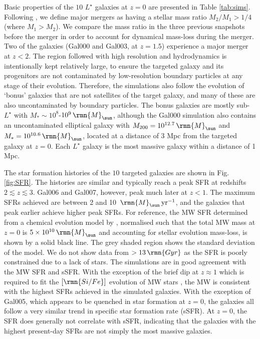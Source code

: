 \documentclass[fleqn,usenatbib]{mnras}
\newcommand\Msun{\,\rmn{M}_{\sun}}
\newcommand\Gyr{\,\rmn{Gyr}}
\newcommand{\pyr}{\,{\rm yr}^{-1}}
\newcommand{\numgal}{10}
\begin{document}
Basic properties of the $\numgal$ $L^\star$ galaxies at $z=0$ are presented in Table \ref{tab:sims}. Following \citet{Qu_et_al_17}, we define major mergers as having a stellar mass ratio $M_2/M_1 > 1/4$ (where $M_1>M_2$). We compare the mass ratio in the three previous snapshots before the merger in order to account for dynamical mass-loss during the merger. 
Two of the galaxies (Gal000 and Gal003, at $z=1.5$) experience a major merger at $z<2$. The region followed with high resolution and hydrodynamics is intentionally kept relatively large, to ensure the targeted galaxy and its progenitors are not contaminated by low-resolution boundary particles at any stage of their evolution. Therefore, the simulations also follow the evolution of `bonus' galaxies that are not satellites of the target galaxy, and many of these are also uncontaminated by boundary particles. The bonus galaxies are mostly sub-$L^\star$ with $M_\ast \sim 10^8$-$10^9 \Msun$, although the Gal000 simulation also contains an uncontaminated elliptical galaxy with $M_{200} = 10^{12.7} \Msun$ and $M_\ast = 10^{10.6} \Msun$, located at a distance of 3 Mpc from the targeted galaxy at $z=0$. Each $L^\star$ galaxy is the most massive galaxy within a distance of 1 Mpc.

The star formation histories of the $\numgal$ targeted galaxies are shown in Fig. \ref{fig:SFR}. The histories are similar and typically reach a peak SFR at redshifts $2 \lesssim z \lesssim 3$. Gal006 and Gal007, however, peak much later at $z<1$. The maximum SFRs achieved are between 2 and 10 $\Msun \pyr$, and the galaxies that peak earlier achieve higher peak SFRs.
For reference, the MW SFR determined from a chemical evolution model by \citet{Snaith_et_al_14,Snaith_et_al_15}, normalised such that the total MW mass at $z=0$ is $5 \times 10^{10} \Msun$ \citep{Bland-Hawthorn_and_Gerhard_16} and accounting for stellar evolution mass-loss, is shown by a solid black line. The grey shaded region shows the standard deviation of the model. We do not show data from $>13 \Gyr$ as the SFR is poorly constrained due to a lack of stars. The simulations are in good agreement with the MW SFR and sSFR. With the exception of the brief dip at $z\approx1$ which is required to fit the $[\rmn{Si/Fe}]$ evolution of MW stars \citep{Snaith_et_al_15}, the MW is consistent with the highest SFRs achieved in the simulated galaxies.
With the exception of Gal005, which appears to be quenched in star formation at $z=0$, the galaxies all follow a very similar trend in specific star formation rate (sSFR). At $z=0$, the SFR does generally not correlate with sSFR, indicating that the galaxies with the highest present-day SFRs are not simply the most massive galaxies.
\end{document}

